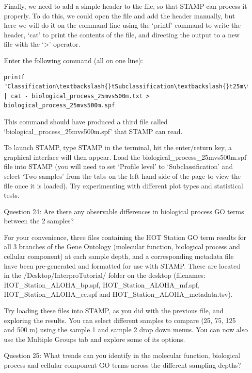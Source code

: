 Finally, we need to add a simple header to the file, so that STAMP can process it properly. To do this, we could open the file and add the header manually, but here we will do it on the command line using the ‘printf’ command to write the header, ‘cat’ to print the contents of the file, and directing the output to a new file with the ‘>’ operator.

\begin{steps}
Enter the following command (all on one line):
\begin{lstlisting}
printf "Classification\textbackslash{}tSubclassification\textbackslash{}t25m\textbackslash{}t500m\textbackslash{}n" | cat - biological_process_25mvs500m.txt > biological_process_25mvs500m.spf
\end{lstlisting}
This command should have produced a third file called ‘biological\_process\_25mvs500m.spf’ that STAMP can read.
\end{steps}

\begin{steps}
To launch STAMP, type STAMP in the terminal, hit the enter/return key, a graphical interface will then appear. Load the biological\_process\_25mvs500m.spf file into STAMP (you will need to set ‘Profile level’ to ‘Subclassification’ and select ‘Two samples’ from the tabs on the left hand side of the page to view the file once it is loaded). Try experimenting with different plot types and statistical tests.

Question 24: Are there any observable differences in biological process GO terms between the 2 samples?
\end{steps}

For your convenience, three files containing the HOT Station GO term results for all 3 branches of the Gene Ontology (molecular function, biological process and cellular component) at each sample depth, and a corresponding metadata file have been pre-generated and formatted for use with STAMP. These are located in the /Desktop/InterproTutorial/ folder on the desktop (filenames: HOT\_Station\_ALOHA\_bp.spf, HOT\_Station\_ALOHA\_mf.spf, HOT\_Station\_ALOHA\_cc.spf and HOT\_Station\_ALOHA\_metadata.tsv). 

\begin{steps}
Try loading these files into STAMP, as you did with the previous file, and exploring the results. You can select different samples to compare (25, 75, 125 and 500 m) using the sample 1 and sample 2 drop down menus. You can now also use the Multiple Groups tab and explore some of its options.
  
Question 25: What trends can you identify in the molecular function, biological process and cellular component GO terms across the different sampling depths?
\end{steps}
